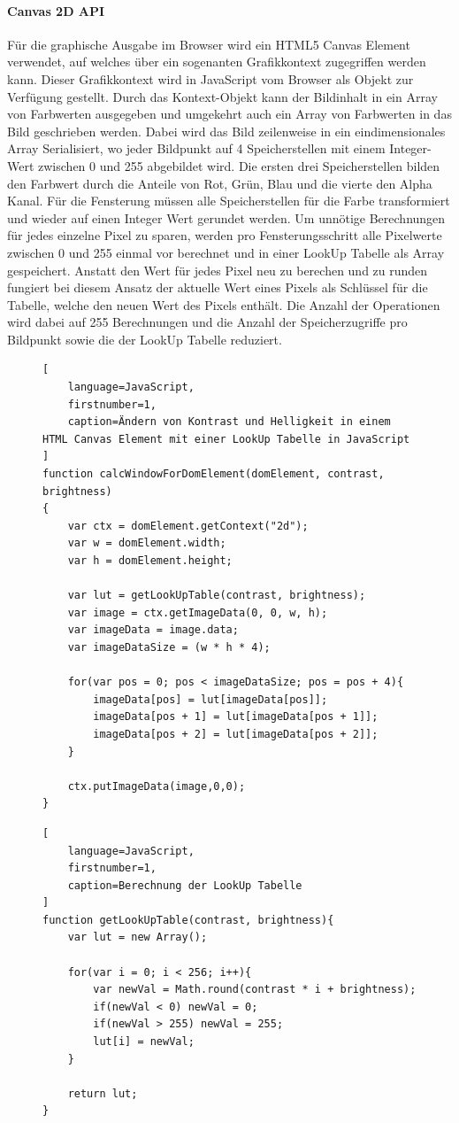 \paragraph{Canvas 2D API}
Für die graphische Ausgabe im Browser wird ein HTML5 Canvas Element verwendet,
auf welches über ein sogenanten Grafikkontext zugegriffen werden kann. 
Dieser Grafikkontext wird in JavaScript vom Browser als Objekt zur Verfügung gestellt.
Durch das Kontext-Objekt kann der Bildinhalt in ein Array von Farbwerten ausgegeben und umgekehrt auch ein Array von Farbwerten in das Bild geschrieben werden.
Dabei wird das Bild zeilenweise in ein eindimensionales Array Serialisiert, 
wo jeder Bildpunkt auf 4 Speicherstellen mit einem Integer-Wert zwischen 0 und 255 abgebildet wird.
Die ersten drei Speicherstellen bilden den Farbwert durch die Anteile von Rot, Grün, Blau und die vierte den Alpha Kanal.
Für die Fensterung müssen alle Speicherstellen für die Farbe transformiert und wieder auf einen Integer Wert gerundet werden.
%
Um unnötige Berechnungen für jedes einzelne Pixel zu sparen, 
werden pro Fensterungsschritt alle Pixelwerte zwischen 0 und 255 einmal vor berechnet und in einer LookUp Tabelle als Array gespeichert.
Anstatt den Wert für jedes Pixel neu zu berechen und zu runden fungiert bei diesem Ansatz der aktuelle Wert eines Pixels als Schlüssel für die Tabelle, 
welche den neuen Wert des Pixels enthält.
Die Anzahl der Operationen wird dabei auf 255 Berechnungen und die Anzahl der Speicherzugriffe pro Bildpunkt sowie die der LookUp Tabelle reduziert.
\begin{figure}[t]
\begin{lstlisting}[
	language=JavaScript,
	firstnumber=1,
	caption=Ändern von Kontrast und Helligkeit in einem HTML Canvas Element mit einer LookUp Tabelle in JavaScript
]
function calcWindowForDomElement(domElement, contrast, brightness)
{
    var ctx = domElement.getContext("2d");
    var w = domElement.width;
    var h = domElement.height;

    var lut = getLookUpTable(contrast, brightness);
    var image = ctx.getImageData(0, 0, w, h);
    var imageData = image.data;
    var imageDataSize = (w * h * 4);

    for(var pos = 0; pos < imageDataSize; pos = pos + 4){
        imageData[pos] = lut[imageData[pos]];
        imageData[pos + 1] = lut[imageData[pos + 1]];
        imageData[pos + 2] = lut[imageData[pos + 2]];
    }

    ctx.putImageData(image,0,0);
}
\end{lstlisting}
\end{figure}
%
\begin{figure}[t]
\begin{lstlisting}[
	language=JavaScript,
	firstnumber=1,
	caption=Berechnung der LookUp Tabelle
]
function getLookUpTable(contrast, brightness){
    var lut = new Array();

    for(var i = 0; i < 256; i++){
        var newVal = Math.round(contrast * i + brightness);
        if(newVal < 0) newVal = 0;
        if(newVal > 255) newVal = 255;
        lut[i] = newVal;
    }

    return lut;
}
\end{lstlisting}
\end{figure}

